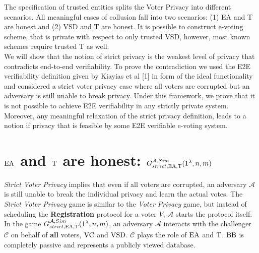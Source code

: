  The specification of trusted entities splits the Voter Privacy into different scenarios. All meaningful cases of collusion fall into two scenarios: (1) EA and T are honest and (2) VSD and T are honest. It is possible to construct e-voting scheme, that is private with respect to only trusted VSD, however, most known schemes require trusted T as well. \\
 
We will show that the notion of strict privacy is the weakest level of privacy that contradicts end-to-end verifiability. To prove the contradiction we used the E2E verifiability definition given by Kiayias et al [1] in form of the ideal functionality \cite{idfunc} and considered a strict voter privacy case where all voters are corrupted but an adversary is still unable to break privacy. Under this framework, we prove that it is not possible to achieve E2E verifiability in any strictly private system. Moreover, any meaningful relaxation of the strict privacy definition, leads to a notion if privacy that is feasible by some E2E verifiable e-voting system.

\section{$\operatorname{EA}$ and $\operatorname{T}$ are honest: $G_{strict,\operatorname{EA},\operatorname{T}}^{\mathcal{A}, Sim}(1^{\lambda},n,m)$}
\textit{Strict Voter Privacy} implies that even if all voters are corrupted,   an adversary $\mathcal{A}$ is still unable to break the individual privacy and learn the actual votes. The \textit{Strict Voter Privacy}  game is similar to the \textit{Voter Privacy} game, but instead of scheduling the \textbf{Registration} protocol for a voter $V$,  $\mathcal{A}$ starts the protocol itself. \\

In the game  $G_{strict,\operatorname{EA},\operatorname{T}}^{\mathcal{A}, Sim}(1^{\lambda},n,m)$, an adversary $\mathcal{A}$ interacts with the challenger $\mathcal{C}$ on behalf of \textbf{all} voters, $\operatorname{VC}$ and $\operatorname{VSD}$. $\mathcal{C}$ plays the role of $\operatorname{EA}$ and $\operatorname{T}$. $\operatorname{BB}$ is completely passive and represents a publicly viewed database. \\

